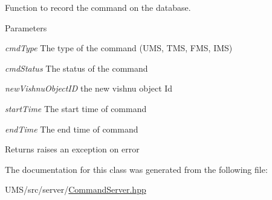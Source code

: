 Function to record the command on the database. 


\begin{DoxyParams}{Parameters}
\item[{\em cmdType}]The type of the command (UMS, TMS, FMS, IMS) \item[{\em cmdStatus}]The status of the command \item[{\em newVishnuObjectID}]the new vishnu object Id \item[{\em startTime}]The start time of command \item[{\em endTime}]The end time of command \end{DoxyParams}
\begin{DoxyReturn}{Returns}
raises an exception on error 
\end{DoxyReturn}


The documentation for this class was generated from the following file:\begin{DoxyCompactItemize}
\item 
UMS/src/server/\hyperlink{CommandServer_8hpp}{CommandServer.hpp}\end{DoxyCompactItemize}
